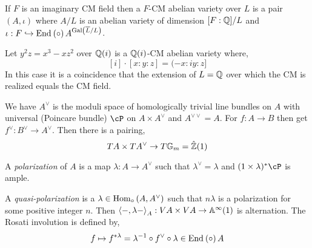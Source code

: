 \documentclass[12pt]{article}
\begin{document}
\begin{defn}
If $F$ is an imaginary CM field then a $F$-CM abelian variety over $L$ is a pair $(A, \iota)$ where $A/L$ is an abelian variety of dimension $[F : \mathbb{Q}]/L$ and $\iota : F \hookrightarrow \mathrm{End}_{} \left( \circ \right){A}^{\mathrm{Gal}\left( \overline{L}/L \right)}$. 
\end{defn}

\begin{example}
Let $y^2 z = x^3 - x z^2$ over $\mathbb{Q}(i)$ is a $\mathbb{Q}(i)$-CM abelian variety where,
\[ [i] \cdot [x : y : z] = (-x : i y : z] \]
In this case it is a coincidence that the extension of $L = \mathbb{Q}$ over which the CM is realized equals the CM field. 
\end{example}

We have $A^\vee$ is the moduli space of homologically trivial line bundles on $A$ with universal (Poincare bundle) $\cP$ on $A \times A^\vee$ and $A^{\vee \vee} = A$. For $f : A \to B$ then get $f^{\vee} : B^{\vee} \to A^{\vee}$. Then there is a pairing,
\[ T A \times T A^\vee \to T \mathbb{G}_m = \hat{\mathbb{Z}}(1) \]

\begin{defn}
A \textit{polarization} of $A$ is a map $\lambda : A \to A^\vee$ such that $\lambda^\vee = \lambda$ and $(1 \times \lambda)^* \cP$ is ample.
\end{defn}

\begin{defn}
A \textit{quasi-polarization} is a $\lambda \in \mathrm{Hom}_{\circ} \left( A, A^\vee \right)$ such that $n \lambda$ is a polarization for some positive integer $n$. Then $\left<-, \lambda -\right>_A : V A \times VA \to \mathbb{A}^{\infty}(1)$ is alternation. The Rosati involution is defined by,
\[ f \mapsto f^{* \lambda} = \lambda^{-1} \circ f^{\vee} \circ \lambda \in \mathrm{End}_{} \left( \circ \right){A} \]
\end{defn}
\end{document}
